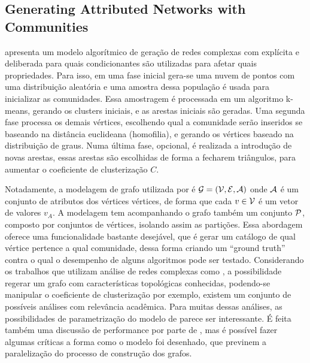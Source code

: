 \documentclass[notes.tex]{subfiles}
\begin{document}
\subsection{Generating Attributed Networks with Communities}

 apresenta um modelo algorítmico de geração de redes complexas com explícita e deliberada para quais condicionantes são utilizadas para afetar quais propriedades.
Para isso, em uma fase inicial gera-se uma nuvem de pontos com uma distribuição aleatória e uma amostra dessa população é usada para inicializar as comunidades.
Essa amostragem é processada em um algoritmo k-means, gerando os clusters iniciais, e as arestas iniciais são geradas.
Uma segunda fase processa os demais vértices, escolhendo qual a comunidade serão inseridos se baseando na distância euclideana (homofilia), e gerando os vértices baseado na distribuição de graus.
Numa última fase, opcional, é realizada a introdução de novas arestas, essas arestas são escolhidas de forma a fecharem triângulos, para aumentar o coeficiente de clusterização $C$.

Notadamente, a modelagem de grafo utilizada por  é $\operatorname{\mathcal{G}} = (\operatorname{\mathcal{V}}, \operatorname{\mathcal{E}}, \operatorname{\mathcal{A}})$ onde  $\operatorname{\mathcal{A}}$ é um conjunto de atributos dos vértices vértices, de forma que cada $v \in \operatorname{\mathcal{V}}$ é um vetor de valores  $v_A$.
A modelagem tem acompanhando o grafo também um conjunto $\operatorname{\mathcal{P}}$, composto por conjuntos de vértices, isolando assim as partições.
Essa abordagem oferece uma funcionalidade bastante desejável, que é gerar um catálogo de qual vértice pertence a qual comunidade, dessa forma criando um ``ground truth'' contra o qual o desempenho de alguns algoritmos pode ser testado.
Considerando os trabalhos que utilizam análise de redes complexas como , a possibilidade regerar um grafo com características topológicas conhecidas, podendo-se manipular o coeficiente de clusterização por exemplo, existem um conjunto de possíveis análises com relevância acadêmica.
Para muitas dessas análises, as possibilidades de parametrização do modelo de  parece ser interessante.
É feita também uma discussão de performance por parte de , mas é possível fazer algumas críticas a forma como o modelo foi desenhado, que previnem a paralelização do processo de construção dos grafos.
\end{document}
